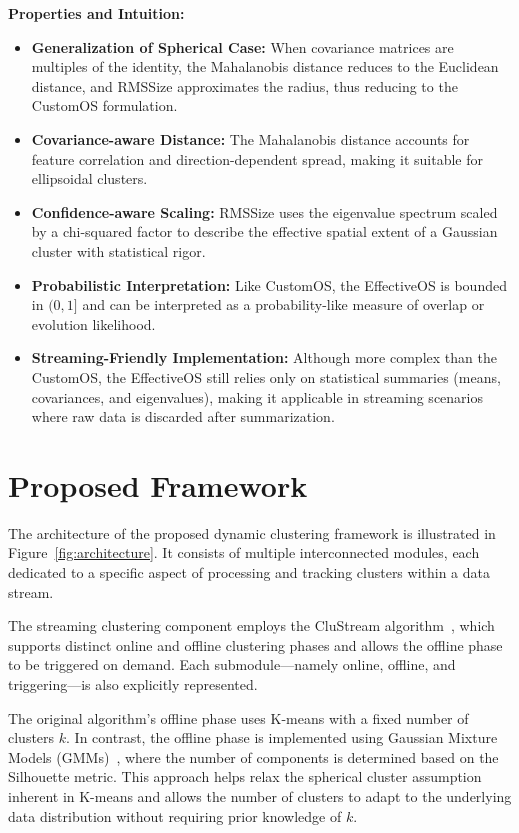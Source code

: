 \textbf{Properties and Intuition:}
\begin{itemize}
      \item \textbf{Generalization of Spherical Case:} When covariance matrices are multiples
            of the identity, the Mahalanobis distance reduces to the Euclidean distance, and
            RMSSize approximates the radius, thus reducing to the CustomOS formulation.
      \item \textbf{Covariance-aware Distance:} The Mahalanobis distance accounts for
            feature correlation and direction-dependent spread, making it suitable for ellipsoidal clusters.
      \item \textbf{Confidence-aware Scaling:} RMSSize uses the eigenvalue spectrum scaled
            by a chi-squared factor to describe the effective spatial extent of a Gaussian cluster
            with statistical rigor.
      \item \textbf{Probabilistic Interpretation:} Like CustomOS, the EffectiveOS is bounded
            in $ (0, 1] $ and can be interpreted as a probability-like measure of overlap or evolution
            likelihood.
      \item \textbf{Streaming-Friendly Implementation:} Although more complex than the CustomOS,
            the EffectiveOS still relies only on statistical summaries (means, covariances, and eigenvalues),
            making it applicable in streaming scenarios where raw data is discarded after summarization.
\end{itemize}

\section{Proposed Framework}\label{sec:proposed_framework}

The architecture of the proposed dynamic clustering framework is illustrated in
Figure~\ref{fig:architecture}. It consists of multiple interconnected modules,
each dedicated to a specific aspect of processing and tracking clusters within
a data stream.

The streaming clustering component employs the CluStream
algorithm~\cite{clustream}, which supports distinct online and offline
clustering phases and allows the offline phase to be triggered on demand. Each
submodule—namely online, offline, and triggering—is also explicitly
represented.

The original algorithm's offline phase uses K-means with a fixed number of
clusters $ k $. In contrast, the offline phase is implemented using Gaussian
Mixture Models (GMMs)~\cite{gaussian_mixtures}, where the number of components
is determined based on the Silhouette metric. This approach helps relax the
spherical cluster assumption inherent in K-means and allows the number of
clusters to adapt to the underlying data distribution without requiring prior
knowledge of $ k $.

